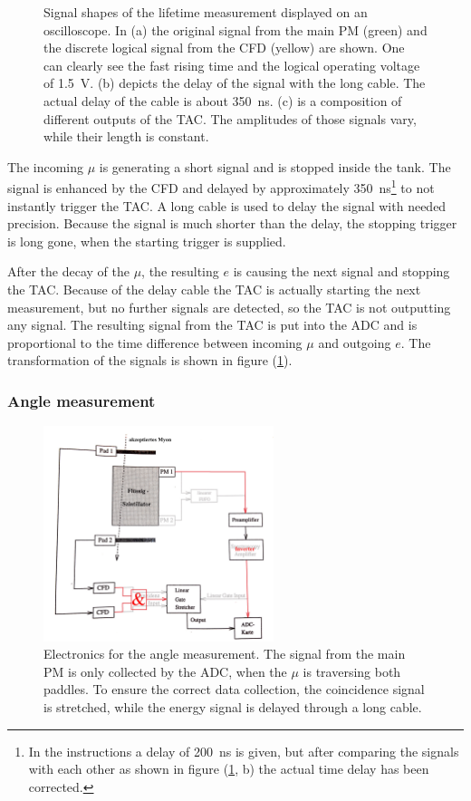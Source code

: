 \begin{figure}[ht]
		\caption{Signal shapes of the lifetime measurement displayed on an oscilloscope.
			In (a) the original signal from the main PM (green) and the discrete logical signal from the CFD (yellow) are shown. One can clearly see the fast rising time and the logical operating voltage of \SI{1.5}{\volt}.
			(b) depicts the delay of the signal with the long cable. The actual delay of the cable is about \SI{350}{\nano\second}.
			(c) is a composition of different outputs of the TAC. The amplitudes of those signals vary, while their length is constant.
		}
		\label{fig:signal_lifetime}
	\end{figure}

	The incoming $\mu$ is generating a short signal and is stopped inside the tank.
	The signal is enhanced by the CFD and delayed by approximately \SI{350}{\nano\second}\footnote{In the instructions a delay of \SI{200}{\nano\second} is given, but after comparing the signals with each other as shown in figure (\ref{fig:signal_lifetime}, b) the actual time delay has been corrected.} to not instantly trigger the TAC.
	A long cable is used to delay the signal with needed precision.
	Because the signal is much shorter than the delay, the stopping trigger is long gone, when the starting trigger is supplied.
	
	After the decay of the $\mu$, the resulting $e$ is causing the next signal and stopping the TAC.
	Because of the delay cable the TAC is actually starting the next measurement, but no further signals are detected, so the TAC is not outputting any signal.
	The resulting signal from the TAC is put into the ADC and is proportional to the time difference between incoming $\mu$ and outgoing $e$.
	The transformation of the signals is shown in figure (\ref{fig:signal_lifetime}).
	
\subsubsection{Angle measurement}

	\begin{figure}[ht]
		\centering
		\includegraphics[width=0.6\textwidth]{img/winkel.jpg}
		\caption{Electronics for the angle measurement.
				The signal from the main PM is only collected by the ADC, when the $\mu$ is traversing both paddles.
				To ensure the correct data collection, the coincidence signal is stretched, while the energy signal is delayed through a long cable.
			}
		\label{fig:electronics_angle}
	\end{figure}

